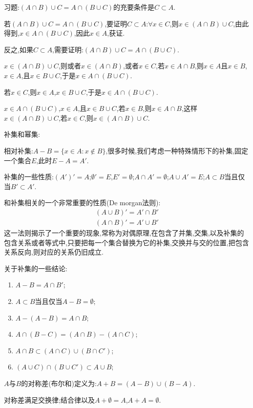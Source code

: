 \documentclass[12pt,a4paper,openany]{book}
\begin{document}
习题:$(A \cap B) \cup C = A \cap (B \cup C)$的充要条件是$C \subset A$.

若$(A \cap B) \cup C = A \cap (B \cup C)$,要证明$C \subset A$:$\forall x \in C$,则$x \in (A \cap B) \cup C$,由此得到,$x \in A \cap (B \cup C)$,因此$x \in A$,获证.

反之,如果$C \subset A$,需要证明:$(A \cap B) \cup C = A \cap (B \cup C)$.

$x \in (A \cap B) \cup C$,则或者$x \in (A \cap B)$,或者$x \in C$,若$x \in A \cap B$,则$x \in A$且$x \in B$,$x \in A$,且$x \in B \cup C$,于是$x \in A \cap (B \cup C)$.

若$x \in C$,则$x \in A$,$x \in B \cup C$,于是$x \in A \cap (B \cup C)$.

$x \in A \cap (B \cup C)$,$x \in A$,且$x \in B \cup C$,若$x \in B$,则$x \in A \cap B$,这样$x \in (A \cap B) \cup C$,若$x \in C$,则$x \in (A \cap B) \cup C$.

补集和幂集:

相对补集:$A - B = \{x \in A: x \notin B\}$,很多时候,我们考虑一种特殊情形下的补集,固定一个集合$E$,此时$E-A=A'$.

补集的一些性质:$(A')'=A$;$\emptyset'=E$,$E'=\emptyset$;$A \cap A'=\emptyset$;$A \cup A'=E$;$A \subset B$当且仅当$B' \subset A'$.

和补集相关的一个非常重要的性质(De morgan法则):
\begin{gather*}
(A \cup B)' = A' \cap B' \\
(A \cap B)' = A' \cup B'
\end{gather*}
这一法则揭示了一个重要的现象,常称为对偶原理,在包含了并集,交集,以及补集的包含关系或者等式中,只要把每一个集合替换为它的补集,交换并与交的位置,把包含关系反向,则对应的关系仍旧成立.

关于补集的一些结论:
\begin{enumerate}
\item $A - B = A \cap B'$;
\item $A \subset B$当且仅当$A - B = \emptyset$;
\item $A - (A - B) = A \cap B$;
\item $A \cap (B - C) = (A \cap B) - (A \cap C)$;
\item $A \cap B \subset (A \cap C) \cup (B \cap C')$;
\item $(A \cup C) \cap (B \cup C') \subset A \cup B$;
\end{enumerate}

$A$与$B$的对称差(布尔和)定义为:$A + B = (A-B) \cup (B-A)$.

对称差满足交换律;结合律以及$A + \emptyset = A$,$A + A = \emptyset$.
\end{document}
